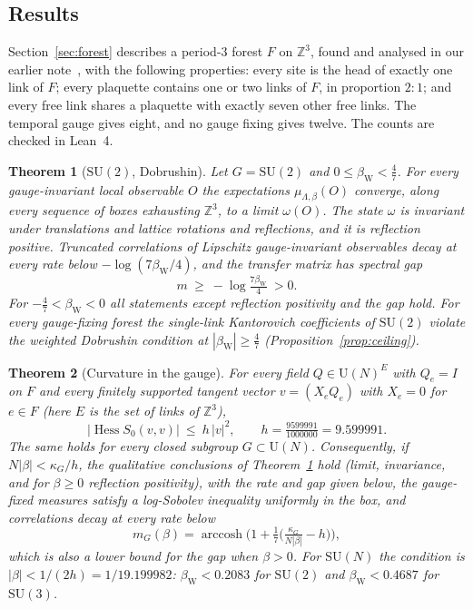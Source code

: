 \documentclass[11pt]{amsart}
\newtheorem{theorem}{Theorem}[section]
\theoremstyle{definition}
\theoremstyle{remark}
\newcommand{\Hess}{\operatorname{Hess}}
\newcommand{\SU}{\mathrm{SU}}
\newcommand{\U}{\mathrm{U}}
\newcommand{\Z}{\mathbb{Z}}
\begin{document}
\subsection*{Results}
Section~\ref{sec:forest} describes a period-$3$ forest $F$ on $\Z^3$, found and analysed in our earlier
note~\cite{R}, with the following properties: every site is the head of exactly one link of $F$; every plaquette
contains one or two links of $F$, in proportion $2:1$; and every free link shares a plaquette with exactly seven other
free links. The temporal gauge gives eight, and no gauge fixing gives twelve. The counts are checked in Lean~4.

\begin{theorem}[$\SU(2)$, Dobrushin]\label{thm:A}
Let $G=\SU(2)$ and $0\le\beta_{\mathrm W}<\frac47$. For every gauge-invariant local observable $O$ the expectations
$\mu_{\Lambda,\beta}(O)$ converge, along every sequence of boxes exhausting $\Z^3$, to a limit $\omega(O)$. The state
$\omega$ is invariant under translations and lattice rotations and reflections, and it is reflection positive.
Truncated correlations of Lipschitz gauge-invariant observables decay at every rate below
$-\log(7\beta_{\mathrm W}/4)$, and the transfer matrix has spectral gap
\[
m\ \ge\ -\log\tfrac{7\beta_{\mathrm W}}4\ >0 .
\]
For $-\frac47<\beta_{\mathrm W}<0$ all statements except reflection positivity and the gap hold. For every
gauge-fixing forest the single-link Kantorovich coefficients of $\SU(2)$ violate the weighted Dobrushin condition at
$|\beta_{\mathrm W}|\ge\frac47$ (Proposition~\ref{prop:ceiling}).
\end{theorem}

\begin{theorem}[Curvature in the gauge]\label{thm:B}
For every field $Q\in\U(N)^{E}$ with $Q_e=I$ on $F$ and every finitely supported tangent vector $v=(X_eQ_e)$ with $X_e=0$ for $e\in F$ (here $E$ is the set of links of $\Z^3$),
\[
|\Hess S_0(v,v)|\ \le\ h\,|v|^2,\qquad h=\tfrac{9599991}{1000000}=9.599991 .
\]
The same holds for every closed subgroup $G\subset\U(N)$. Consequently, if $N|\beta|<\kappa_G/h$, the qualitative conclusions of
Theorem~\ref{thm:A} hold (limit, invariance, and for $\beta\ge0$ reflection positivity), with the rate and gap given below, the gauge-fixed measures satisfy a
log-Sobolev inequality uniformly in the box, and correlations decay at every rate below
\[
m_G(\beta)=\operatorname{arccosh}\Big(1+\tfrac17\Big(\tfrac{\kappa_G}{N|\beta|}-h\Big)\Big),
\]
which is also a lower bound for the gap when $\beta>0$. For $\SU(N)$ the condition is $|\beta|<1/(2h)=1/19.199982$:
$\beta_{\mathrm W}<0.2083$ for $\SU(2)$ and $\beta_{\mathrm W}<0.4687$ for $\SU(3)$.
\end{theorem}
\end{document}
